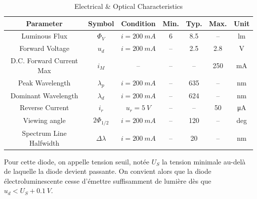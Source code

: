 \documentclass[../DS02.tex]{subfiles}%
\begin{document}
{	\begin{table}[htbp!]
		\centering
		\caption{Electrical \& Optical Characteristics}
		\begin{tabular}{ccccccc}
			\toprule
			\textbf{Parameter}       &
			\textbf{Symbol}          &
			\textbf{Condition}       &
			\textbf{Min.}            &
			\textbf{Typ.}            &
			\textbf{Max.}            &
			\textbf{Unit}
			\\
			\midrule
			Luminous Flux            &
			$\Phi_V$                 &
			$i = \SI{200}{mA}$       &
			6                        &
			8.5                      &
			--                       &
			\si{lm}
			\\
			Forward Voltage          &
			$u_d$                    &
			$i = \SI{200}{mA}$       &
			--                       &
			2.5                      &
			2.8                      &
			\si{V}
			\\
			D.C. Forward Current Max &
			$i_M$                    & --                 & -- & --  & 250 & \si{mA}
			\\
			Peak Wavelength          &
			$\lambda_p$              & $i = \SI{200}{mA}$ & -- & 635 & --  & \si{nm}
			\\
			Dominant Wavelength      &
			$\lambda_d$              & $i = \SI{200}{mA}$ & -- & 624 & --  & \si{nm}
			\\
			Reverse Current          &
			$i_r$                    & $u_r = \SI{5}{V}$  & -- & --  & 50  & \si{\micro A}
			\\
			Viewing angle            &
			$2\Phi_{1/2}$            & $i = \SI{200}{mA}$ & -- & 120 & --  & \si{deg}
			\\
			Spectrum Line Halfwidth  &
			$\Delta{\lambda}$        & $i = \SI{200}{mA}$ & -- & 20  & --  & \si{nm}
			\\
			\bottomrule
		\end{tabular}
		\label{tab:lampe}
	\end{table}

	Pour cette diode, on appelle tension seuil, notée $U_S$ la tension
	minimale au-delà de laquelle la diode devient passante. On convient
	alors que la diode électroluminescente cesse d'émettre suffisamment de
	lumière dès que $u_d < U_S + \SI{0.1}{V}$.
}%
\end{document}

